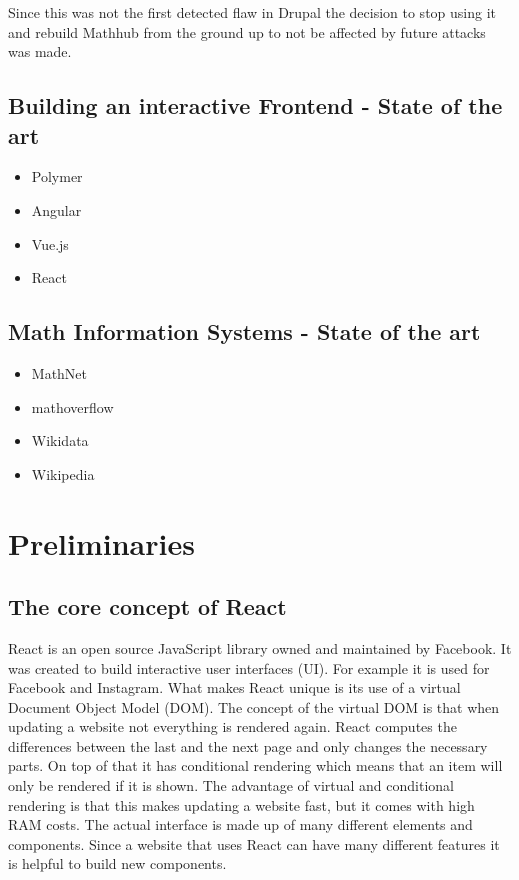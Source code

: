 \documentclass[11pt,a4paper]{article}
\begin{document}
Since this was not the first detected flaw in Drupal the decision to stop using it and rebuild Mathhub from the ground up to not be affected by future attacks was made.

	\subsection{Building an interactive Frontend - State of the art}
	\begin{itemize}
	\item Polymer
	\item Angular
	\item Vue.js
	\item React
	\end{itemize}

\subsection{Math Information Systems -  State of the art}
\begin{itemize}
\item MathNet
\item mathoverflow
\item Wikidata
\item Wikipedia
\end{itemize}

\section{Preliminaries}
	\subsection{The core concept of React} 
	React is an open source JavaScript library owned and maintained by Facebook.	It was created to build interactive user interfaces (UI). For example it is used for Facebook and Instagram. What makes React unique is its use of a virtual Document Object Model (DOM). The concept of the virtual DOM is that when updating a website not everything is rendered again. React computes the differences between the last and the next page and only changes the necessary parts. On top of that it has conditional rendering which means that an item will only be rendered if it is shown. The advantage of virtual and conditional rendering is that this makes updating a website fast, but it comes with high RAM costs. The actual interface is made up of many different elements and components. Since a website that uses React can have many different features it is helpful to build new components. 
\cite{reactjs}
	
\end{document}

